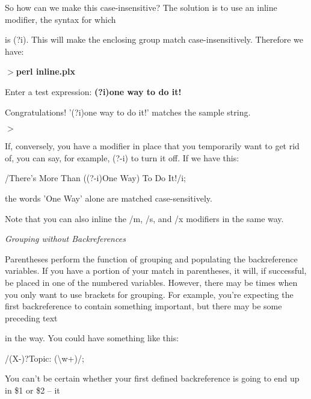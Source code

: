 \documentclass[a4paper,11pt]{book}
\begin{document}
\noindent So how can we make this case-insensitive? The solution is to use an inline modifier, the syntax for which

\noindent is (?i). This will make the enclosing group match case-insensitively. Therefore we have:

\noindent 

\noindent $>$\textbf{perl inline.plx}

\noindent Enter a test expression: \textbf{(?i)one way to do it!}

\noindent Congratulations! '(?i)one way to do it!' matches the sample string.

\noindent $>$

\noindent 

\noindent If, conversely, you have a modifier in place that you temporarily want to get rid of, you can say, for example, (?-i) to turn it off. If we have this:

\noindent 

\noindent 

\noindent /There's More Than ((?-i)One Way) To Do It!/i;

\noindent 

\noindent the words 'One Way' alone are matched case-sensitively.

\noindent 

\noindent Note that you can also inline the /m, /s, and /x modifiers in the same way.

\noindent 

\noindent \textit{Grouping without Backreferences}

\noindent Parentheses perform the function of grouping and populating the backreference variables. If you have a portion of your match in parentheses, it will, if successful, be placed in one of the numbered variables. However, there may be times when you only want to use brackets for grouping. For example, you're expecting the first backreference to contain something important, but there may be some preceding text

\noindent in the way. You could have something like this:

\noindent 

\noindent 

\noindent /(X-)?Topic: (\textbackslash w+)/;

\noindent 

\noindent You can't be certain whether your first defined backreference is going to end up in \$1 or \$2 -- it
\end{document}
